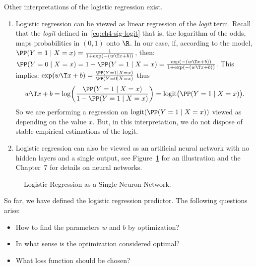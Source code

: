 Other interpretations of the logistic regression exist.
\begin{enumerate}
\item Logistic regression can be viewed as linear regression of the \emph{logit} term.
Recall that the \emph{logit} defined in~\eqref{eq:ch4-sig-logit} that is, the logarithm of the odds,
maps probabilities in $(0, 1)$ onto $\R$. In our case, if, according to the
model, $\PP(Y = 1 \mid X = x) = \frac{1}{1 + \exp(-(w\T x + b))}$, then: $\PP(Y = 0 \mid X = x) =
1 - \PP(Y = 1 \mid X = x) = \frac{\exp(-(w\T x + b))}{1 + \exp(-(w\T x + b))}$. This implies: $\exp(w\T x + b) = \frac{\PP(Y = 1 \mid X = x)}{\PP(Y = 0 \mid X = x)}$ thus
\begin{equation}\label{eq:ch4-logit-regression}
w\T x + b = \log\!\left( \frac{\PP(Y = 1 \mid X = x)}{1 - \PP(Y = 1 \mid X = x)} \right) = \mathrm{logit}\bigl(\PP(Y = 1 \mid X = x)\bigr).
\end{equation}
So we are performing a regression on $\mathrm{logit}(\PP(Y = 1 \mid X = x))$ viewed as
depending on the value $x$. But, in this interpretation, we do not dispose
of stable empirical estimations of the logit.

\item Logistic regression can also be viewed as an artificial neural network with
no hidden layers and a single output, see Figure~\ref{fig:ch4-single-neuron} for an illustration
and the Chapter~7 for details on neural networks.
\end{enumerate}

\begin{figure}[h]\centering
\caption{Logistic Regression as a Single Neuron Network.}\label{fig:ch4-single-neuron}
\end{figure}

So far, we have defined the logistic regression predictor. The following
questions arise:
\begin{itemize}
\item How to find the parameters $w$ and $b$ by optimization?
\item In what sense is the optimization considered optimal?
\item What loss function should be chosen?
\end{itemize}

